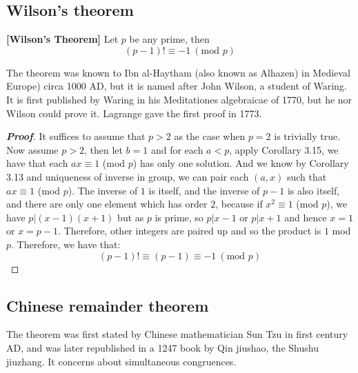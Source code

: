 \subsection{Wilson's theorem}
\begin{theorem}{\bf [Wilson's Theorem]}\label{W;Wilson} Let $p$ be any prime, then
\begin{equation*} (p-1)! \equiv -1 ~(\text{mod }p) \end{equation*}
\end{theorem}
The theorem was known to Ibn al-Haytham (also known as Alhazen) in Medieval Europe) circa 1000 AD, but it is named after John Wilson, a student of Waring. It is first published by Waring in his Meditationes algebraicae of 1770, but he nor Wilson could prove it. Lagrange gave the first proof in 1773.
\begin{proof}[\bf Proof] It suffices to assume that $p>2$ as the case when $p=2$ is trivially true. Now assume $p>2$, then let $b=1$ and for each $a < p$, apply Corollary 3.15, we have that each $ax \equiv 1$ (mod $p$) has only one solution. And we know by Corollary 3.13 and uniqueness of inverse in group, we can pair each $(a,x)$ such that $ax \equiv 1$ (mod $p$). The inverse of $1$ is itself, and the inverse of $p-1$ is also itself, and there are only one element which has order $2$, because if $x^2 \equiv 1$ (mod $p$), we have $p|(x-1)(x+1)$ but as $p$ is prime, so $p|x-1$ or $p|x+1$ and hence $x=1$ or $x=p-1$. Therefore, other integers are paired up and so the product is $1$ mod $p$. Therefore, we have that:
\begin{equation*} (p-1)! \equiv (p-1) \equiv -1 ~(\text{mod } p) \end{equation*}
\end{proof}
\subsection{Chinese remainder theorem}
The theorem was first stated by Chinese mathematician Sun Tzu in first century AD, and was later republished in a 1247 book by Qin jiushao, the Shushu jiuzhang. It concerns about simultaneous congruences.

